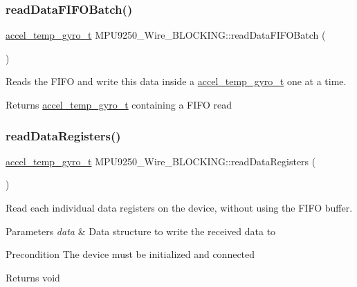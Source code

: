 \subsubsection{\texorpdfstring{read\+Data\+F\+I\+F\+O\+Batch()}{readDataFIFOBatch()}}
{\footnotesize\ttfamily \hyperlink{unionaccel__temp__gyro__t}{accel\+\_\+temp\+\_\+gyro\+\_\+t} M\+P\+U9250\+\_\+\+Wire\+\_\+\+B\+L\+O\+C\+K\+I\+N\+G\+::read\+Data\+F\+I\+F\+O\+Batch (\begin{DoxyParamCaption}{ }\end{DoxyParamCaption})}



Reads the F\+I\+FO and write this data inside a \hyperlink{unionaccel__temp__gyro__t}{accel\+\_\+temp\+\_\+gyro\+\_\+t} one at a time. 

\begin{DoxyReturn}{Returns}
\hyperlink{unionaccel__temp__gyro__t}{accel\+\_\+temp\+\_\+gyro\+\_\+t} containing a F\+I\+FO read 
\end{DoxyReturn}
\mbox{\label{class_m_p_u9250___wire___b_l_o_c_k_i_n_g_a79432cf3440f57dd8fb16d52bc7cf4dd}} 
\subsubsection{\texorpdfstring{read\+Data\+Registers()}{readDataRegisters()}}
{\footnotesize\ttfamily \hyperlink{unionaccel__temp__gyro__t}{accel\+\_\+temp\+\_\+gyro\+\_\+t} M\+P\+U9250\+\_\+\+Wire\+\_\+\+B\+L\+O\+C\+K\+I\+N\+G\+::read\+Data\+Registers (\begin{DoxyParamCaption}{ }\end{DoxyParamCaption})}



Read each individual data registers on the device, without using the F\+I\+FO buffer. 


\begin{DoxyParams}{Parameters}
{\em data} & Data structure to write the received data to \\
\hline
\end{DoxyParams}
\begin{DoxyPrecond}{Precondition}
The device must be initialized and connected 
\end{DoxyPrecond}
\begin{DoxyReturn}{Returns}
void 
\end{DoxyReturn}


